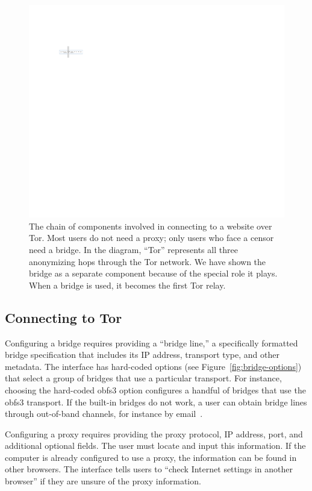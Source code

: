 \documentclass[USenglish,oneside,twocolumn]{article}
\begin{document}
\begin{figure}
\centering
\includegraphics{topology.pdf}
\caption{
The chain of components involved in connecting to a website over Tor.
Most users do not need a proxy;
only users who face a censor need a bridge.
In the diagram, ``Tor'' represents all three anonymizing hops through the Tor network.
We have shown the bridge as a separate component
because of the special role it plays.
When a bridge is used, it becomes the first Tor relay.
}
\label{fig:topology}
\end{figure}

\subsection{Connecting to Tor} 
Configuring a bridge requires providing a
``bridge line,'' a specifically formatted bridge specification that
includes its IP address, transport type, and other metadata.
The interface has hard-coded options (see Figure~\ref{fig:bridge-options}) 
that select a group of bridges that use a particular transport.
For instance, choosing the hard-coded obfs3 option
configures a handful of bridges that use the obfs3 transport.
If the built-in bridges do not work, a user can obtain bridge lines
through out-of-band channels, for instance by email~\cite{bridgedb}.

Configuring a proxy requires providing the proxy protocol, IP address, port, and additional optional fields. The user must locate and input this information. If the computer is already configured to use a proxy, the information can be found in other browsers. The interface tells users to ``check Internet settings in another browser'' if they are unsure of the proxy information. 
\end{document}
